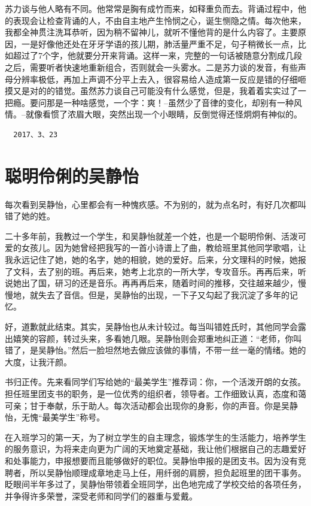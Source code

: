 \documentclass[openany]{ctexbook}
\begin{document}
苏力谈与他人略有不同。他常常是胸有成竹而来，如释重负而去。背诵过程中，他的表现会让检查背诵的人，不由自主地产生怜悯之心，诞生恻隐之情。每次他来，我都全神贯注洗耳恭听，因为稍不留神儿，就听不懂他背的是什么内容了。主要原因，一是好像他还处在牙牙学语的孩儿期，肺活量严重不足，句子稍微长一点，比如超过了7个字，他就要分开来背诵。这样一来，完整的一句话被随意分割成几段之后，需要听者快速地重新组合，否则就会一头雾水。二是苏力谈的发音，有些声母分辨率极低，再加上声调不分平上去入，很容易给人造成第一反应是错的仔细咂摸又是对的的错觉。虽然苏力谈自己可能没有什么感觉，但是，我着着实实过了一把瘾。要问那是一种啥感觉，一个字：爽！--虽然少了音律的变化，却别有一种风情。--就像看惯了浓眉大眼，突然出现一个小眼睛，反倒觉得还怪炯炯有神似的。

\begin{verbatim}
  2017、3、23
\end{verbatim}

\chapter*{聪明伶俐的吴静怡}\label{wujingyi}

每次看到吴静怡，心里都会有一种愧疚感。不为别的，就为点名时，有好几次都叫错了她的姓。

二十多年前，我教过一个学生，和吴静怡就差一个姓，也是一个聪明伶俐、活泼可爱的女孩儿。因为她曾经把我写的一首小诗谱上了曲，教给班里其他同学歌唱，让我永远记住了她，她的名字，她的相貌，她的爱好。后来，分文理科的时候，她报了文科，去了别的班。再后来，她考上北京的一所大学，专攻音乐。再再后来，听说她出了国，研习的还是音乐。再再再后来，随着时间的推移，交往越来越少，慢慢地，就失去了音信。但是，吴静怡的出现，一下子又勾起了我沉淀了多年的记忆。

好，道歉就此结束。其实，吴静怡也从未计较过。每当叫错姓氏时，其他同学会露出嬉笑的容颜，转过头来，多看她几眼。吴静怡则会郑重地纠正道：``老师，你叫错了，是吴静怡。''然后一脸坦然地去做应该做的事情，不带一丝一毫的情绪。她的大度，让我汗颜。

书归正传。先来看同学们写给她的``最美学生''推荐词：你，一个活泼开朗的女孩。担任班里团支书的职务，是一位优秀的组织者，领导者。工作细致认真，态度和蔼可亲；甘于奉献，乐于助人。每次活动都会出现你的身影，你的声音。你是吴静怡，无愧``最美学生''称号。

在入班学习的第一天，为了树立学生的自主理念，锻炼学生的生活能力，培养学生的服务意识，为将来走向更为广阔的天地奠定基础，我让他们根据自己的志趣爱好和处事能力，申报想要而且能够做好的职位。吴静怡申报的是团支书。因为没有竞聘者，所以吴静怡顺理成章地走马上任，用纤弱的肩膀，担负起班里的团干事务。眨眼间半年多过了，吴静怡带领着全班同学，出色地完成了学校交给的各项任务，并争得许多荣誉，深受老师和同学们的器重与爱戴。
\end{document}
